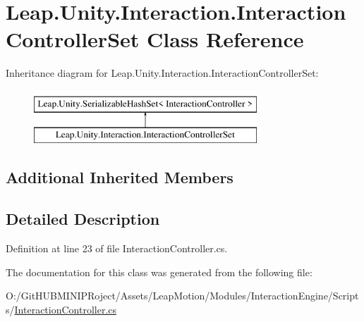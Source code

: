 \hypertarget{class_leap_1_1_unity_1_1_interaction_1_1_interaction_controller_set}{}\section{Leap.\+Unity.\+Interaction.\+Interaction\+Controller\+Set Class Reference}
\label{class_leap_1_1_unity_1_1_interaction_1_1_interaction_controller_set}
Inheritance diagram for Leap.\+Unity.\+Interaction.\+Interaction\+Controller\+Set\+:\begin{figure}[H]
\begin{center}
\leavevmode
\includegraphics[height=2.000000cm]{class_leap_1_1_unity_1_1_interaction_1_1_interaction_controller_set}
\end{center}
\end{figure}
\subsection*{Additional Inherited Members}


\subsection{Detailed Description}


Definition at line 23 of file Interaction\+Controller.\+cs.



The documentation for this class was generated from the following file\+:\begin{DoxyCompactItemize}
\item 
O\+:/\+Git\+H\+U\+B\+M\+I\+N\+I\+P\+Roject/\+Assets/\+Leap\+Motion/\+Modules/\+Interaction\+Engine/\+Scripts/\mbox{\hyperlink{_interaction_controller_8cs}{Interaction\+Controller.\+cs}}\end{DoxyCompactItemize}
